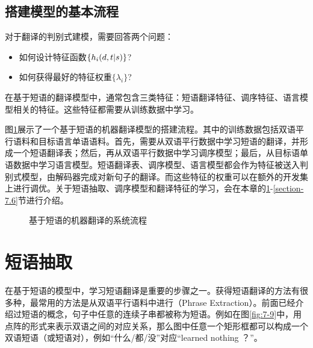 \subsection{搭建模型的基本流程}

\parinterval 对于翻译的判别式建模，需要回答两个问题：

\begin{itemize}
\vspace{0.5em}
\item 如何设计特征函数$\{h_i(d,{t}|{s})\}$?
\vspace{0.5em}
\item 如何获得最好的特征权重$\{\lambda_i\}$?
\vspace{0.5em}
\end{itemize}

在基于短语的翻译模型中，通常包含三类特征：短语翻译特征、调序特征、语言模型相关的特征。这些特征都需要从训练数据中学习。

\parinterval 图\ref{fig:7-8}展示了一个基于短语的机器翻译模型的搭建流程。其中的训练数据包括双语平行语料和目标语言单语语料。首先，需要从双语平行数据中学习短语的翻译，并形成一个短语翻译表；然后，再从双语平行数据中学习调序模型；最后，从目标语单语数据中学习语言模型。短语翻译表、调序模型、语言模型都会作为特征被送入判别式模型，由解码器完成对新句子的翻译。而这些特征的权重可以在额外的开发集上进行调优。关于短语抽取、调序模型和翻译特征的学习，会在本章的\ref{section-7.3}-\ref{section-7.6}节进行介绍。

\begin{figure}[htp]
\centering

\caption{基于短语的机器翻译的系统流程}
\label{fig:7-8}
\end{figure}


\sectionnewpage
\section{短语抽取}\label{section-7.3}

\parinterval 在基于短语的模型中，学习短语翻译是重要的步骤之一。获得短语翻译的方法有很多种，最常用的方法是从双语平行语料中进行{\small{}}（Phrase Extraction）。前面已经介绍过短语的概念，句子中任意的连续子串都被称为短语。例如在图\ref{fig:7-9}中，用点阵的形式来表示双语之间的对应关系，那么图中任意一个矩形框都可以构成一个双语短语（或短语对），例如“什么/都/没”对应“learned nothing ？”。


